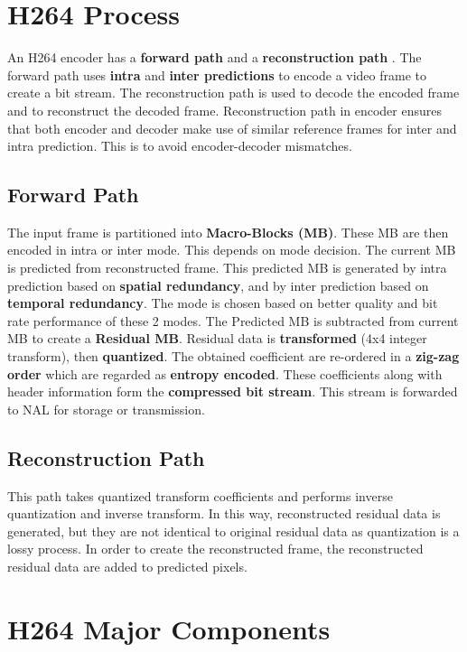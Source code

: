 \section{H264 Process}
An H264 encoder has a \textbf{forward path} and a \textbf{reconstruction path} \cite{sahin2006efficient}. The forward path uses \textbf{intra} and \textbf{inter predictions} to encode a video frame to create a bit stream. The reconstruction path is used to decode the encoded frame and to reconstruct the decoded frame. Reconstruction path in encoder ensures that both encoder and decoder make use of similar reference frames for inter and intra prediction. This is to avoid encoder-decoder mismatches. 

\subsection{Forward Path}
The input frame is partitioned into \textbf{Macro-Blocks (MB)}. These MB are then encoded in intra or inter mode. This depends on mode decision. The current MB is predicted from reconstructed frame. This predicted MB is generated by intra prediction based on \textbf{spatial redundancy}, and by inter prediction based on \textbf{temporal redundancy}. The mode is chosen based on better quality and bit rate performance of these 2 modes. The Predicted MB is subtracted from current MB to create a \textbf{Residual MB}. Residual data is \textbf{transformed} (4x4 integer transform), then \textbf{quantized}. The obtained coefficient are re-ordered in a \textbf{zig-zag order} which are regarded as \textbf{entropy encoded}. These coefficients along with header information form the \textbf{compressed bit stream}. This stream is forwarded to NAL for storage or transmission. 

\subsection{Reconstruction Path}
This path takes quantized transform coefficients and performs inverse quantization and inverse transform. In this way, reconstructed residual data is generated, but they are not identical to original residual data as quantization is a lossy process. In order to create the reconstructed frame, the reconstructed residual data are added to predicted pixels. 


\section{H264 Major Components}

